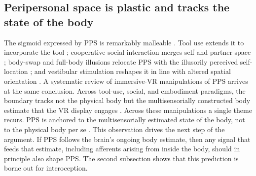 \subsection{Peripersonal space is plastic and tracks the state of the body}


The sigmoid expressed by PPS is remarkably malleable \citep{Serino2019, Bufacchi2018, noel_2021, karakoc_2025}. Tool use extends it to incorporate the tool \citep{iriki1996coding, maravita2004tools}; cooperative social interaction merges self and partner space \citep{teneggi2013social}; body-swap and full-body illusions relocate PPS with the illusorily perceived self-location \citep{noel2015peripersonal, noel2015fullbody}; and vestibular stimulation reshapes it in line with altered spatial orientation \citep{pfeiffer2018vestibular}. A systematic review of immersive-VR manipulations of PPS arrives at the same conclusion. Across tool-use, social, and embodiment paradigms, the boundary tracks not the physical body but the multisensorially constructed body estimate that the VR display engages \citep{karakoc_2025}. Across these manipulations a single theme recurs. PPS is anchored to the multisensorially estimated state of the body, not to the physical body per se \citep{blanke2015behavioral, Grivaz2017, serino2015bodypart, noel_2021}. This observation drives the next step of the argument. If PPS follows the brain's ongoing body estimate, then any signal that feeds that estimate, including afferents arising from inside the body, should in principle also shape PPS. The second subsection shows that this prediction is borne out for interoception.

